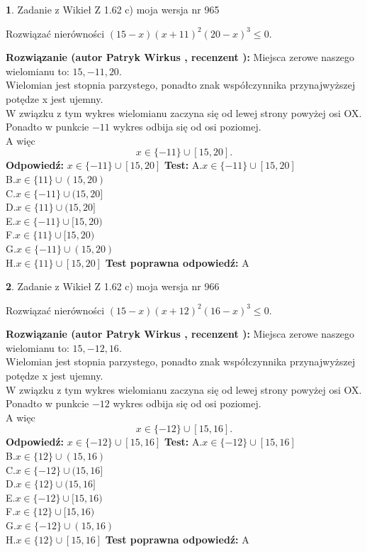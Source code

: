 \documentclass[12pt, a4paper]{article}
\theoremstyle{definition} %
\newtheorem{zad}{}
\newcommand{\zadStart}[1]{\begin{zad}#1\newline}
\newcommand{\zadStop}{\end{zad}}
\newcommand{\rozwStart}[2]{\noindent \textbf{Rozwiązanie (autor #1 , recenzent #2): }\newline}
\newcommand{\rozwStop}{\newline}
\newcommand{\odpStart}{\noindent \textbf{Odpowiedź:}\newline}
\newcommand{\odpStop}{\newline}
\newcommand{\testStart}{\noindent \textbf{Test:}\newline}
\newcommand{\testStop}{\newline}
\newcommand{\kluczStart}{\noindent \textbf{Test poprawna odpowiedź:}\newline}
\newcommand{\kluczStop}{\newline}
\begin{document}
\zadStart{Zadanie z Wikieł Z 1.62 c) moja wersja nr 965}

Rozwiązać nierówności $(15-x)(x+11)^{2}(20-x)^{3}\le0$.
\zadStop
\rozwStart{Patryk Wirkus}{}
Miejsca zerowe naszego wielomianu to: $15, -11, 20$.\\
Wielomian jest stopnia parzystego, ponadto znak współczynnika przy\linebreak najwyższej potędze x jest ujemny.\\ W związku z tym wykres wielomianu zaczyna się od lewej strony powyżej osi OX.\\
Ponadto w punkcie $-11$ wykres odbija się od osi poziomej.\\
A więc $$x \in \{-11\} \cup [15,20].$$
\rozwStop
\odpStart
$x \in \{-11\} \cup [15,20]$
\odpStop
\testStart
A.$x \in \{-11\} \cup [15,20]$\\
B.$x \in \{11\} \cup (15,20)$\\
C.$x \in \{-11\} \cup (15,20]$\\
D.$x \in \{11\} \cup (15,20]$\\
E.$x \in \{-11\} \cup [15,20)$\\
F.$x \in \{11\} \cup [15,20)$\\
G.$x \in \{-11\} \cup (15,20)$\\
H.$x \in \{11\} \cup [15,20]$
\testStop
\kluczStart
A
\kluczStop



\zadStart{Zadanie z Wikieł Z 1.62 c) moja wersja nr 966}

Rozwiązać nierówności $(15-x)(x+12)^{2}(16-x)^{3}\le0$.
\zadStop
\rozwStart{Patryk Wirkus}{}
Miejsca zerowe naszego wielomianu to: $15, -12, 16$.\\
Wielomian jest stopnia parzystego, ponadto znak współczynnika przy\linebreak najwyższej potędze x jest ujemny.\\ W związku z tym wykres wielomianu zaczyna się od lewej strony powyżej osi OX.\\
Ponadto w punkcie $-12$ wykres odbija się od osi poziomej.\\
A więc $$x \in \{-12\} \cup [15,16].$$
\rozwStop
\odpStart
$x \in \{-12\} \cup [15,16]$
\odpStop
\testStart
A.$x \in \{-12\} \cup [15,16]$\\
B.$x \in \{12\} \cup (15,16)$\\
C.$x \in \{-12\} \cup (15,16]$\\
D.$x \in \{12\} \cup (15,16]$\\
E.$x \in \{-12\} \cup [15,16)$\\
F.$x \in \{12\} \cup [15,16)$\\
G.$x \in \{-12\} \cup (15,16)$\\
H.$x \in \{12\} \cup [15,16]$
\testStop
\kluczStart
A
\kluczStop
\end{document}
